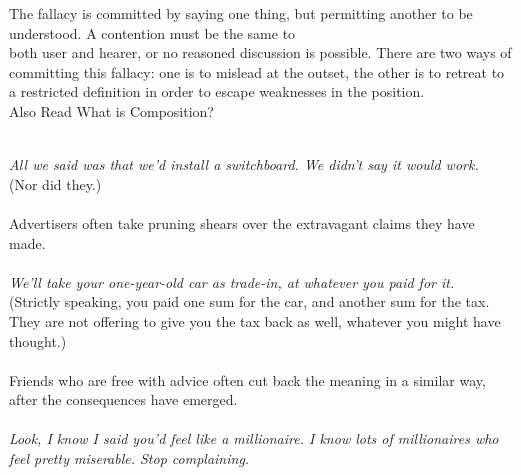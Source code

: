 \documentclass[a4paper,12pt,single,pdftex]{scrartcl}
\begin{document}
    
      The fallacy is committed by saying one thing, but permitting another to be understood. A contention must be the same to
    \\

    
      both user and hearer, or no reasoned discussion is possible. There are two ways of committing this fallacy: one is to mislead at the outset, the other is to retreat to a restricted definition in order to escape weaknesses in the position.
    \\

    
      

      
        Also Read  What is Composition?
      
    
    
       
    \\

    
      {\em All we said was that we’d install a switchboard. We didn’t say it would work.}
    \\

    
      (Nor did they.)
    \\

    
       
    \\

    
      Advertisers often take pruning shears over the extravagant claims they have made.
    \\

    
       
    \\

    
      {\em We’ll take your one-year-old car as trade-in, at whatever you paid for it.}
    \\

    
      (Strictly speaking, you paid one sum for the car, and another sum for the tax. They are not offering to give you the tax back as well, whatever you might have thought.)
    \\

    
       
    \\

    
      Friends who are free with advice often cut back the meaning in a similar way, after the consequences have emerged.
    \\

    
       
    \\

    
      {\em Look, I know I said you’d feel like a millionaire. I know lots of millionaires who feel pretty miserable. Stop complaining.}
    \\
\end{document}
